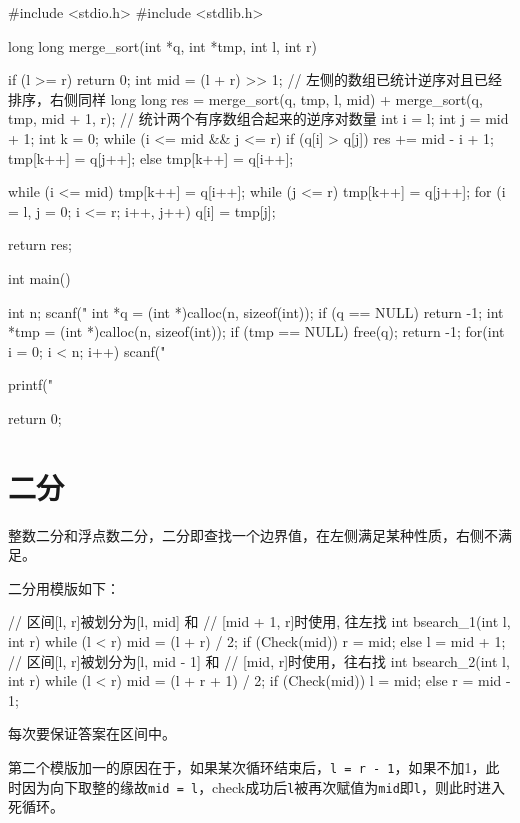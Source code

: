 \begin{mycpptwocol}[归并排序计算逆序对数量]
#include <stdio.h>
#include <stdlib.h>

long long merge_sort(int *q, int *tmp,
                     int l, int r) {
    if (l >= r) {
        return 0;
    }
    int mid = (l + r) >> 1;
    // 左侧的数组已统计逆序对且已经排序，右侧同样
    long long res = merge_sort(q, tmp, l, mid) + merge_sort(q, tmp, mid + 1, r);
    // 统计两个有序数组合起来的逆序对数量
    int i = l;
    int j = mid + 1;
    int k = 0;
    while (i <= mid && j <= r) {
        if (q[i] > q[j]) {
            res += mid - i + 1;
            tmp[k++] = q[j++];
        } else {
            tmp[k++] = q[i++];
        }
    }
    
    while (i <= mid) {
        tmp[k++] = q[i++];
    }
    while (j <= r) {
        tmp[k++] = q[j++];
    }
    for (i = l, j = 0; i <= r;
         i++, j++) {
        q[i] = tmp[j];
    }
    
    return res;
}

int main()
{
    int n;
    scanf("%
    int *q = (int *)calloc(n, sizeof(int));
    if (q == NULL) {
        return -1;
    }
    int *tmp = (int *)calloc(n, sizeof(int));
    if (tmp == NULL) {
        free(q);
        return -1;
    }
    for(int i = 0; i < n; i++) {
        scanf("%
    }
    
    printf("%

    return 0;
}
\end{mycpptwocol}
\section{二分}
整数二分和浮点数二分，二分即查找一个边界值，在左侧满足某种性质，右侧不满足。

二分用模版如下：
\begin{mycpptwocol}[二分模版]
// 区间[l, r]被划分为[l, mid] 和
// [mid + 1, r]时使用, 往左找
int bsearch_1(int l, int r)
{
    while (l < r) {
        mid = (l + r) / 2;
        if (Check(mid)) {
            r = mid;
        } else {
            l = mid + 1;
        }
    }
}
// 区间[l, r]被划分为[l, mid - 1] 和
// [mid, r]时使用，往右找
int bsearch_2(int l, int r)
{
    while (l < r) {
        mid = (l + r + 1) / 2;
        if (Check(mid)) {
            l = mid;
        } else {
            r = mid - 1;
        }
    }
}
\end{mycpptwocol}

\begin{keypoint}
    每次要保证答案在区间中。

    第二个模版加一的原因在于，如果某次循环结束后，\lstinline{l = r - 1}，如果不加1，此时因为向下取整的缘故\lstinline{mid = l}，check成功后\lstinline{l}被再次赋值为\lstinline{mid}即\lstinline{l}，则此时进入死循环。
\end{keypoint}

